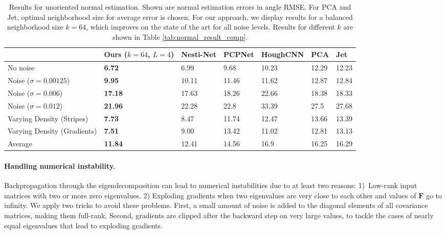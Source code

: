 \documentclass[10pt,twocolumn,letterpaper]{article}
\begin{document}
\begin{table*}[t]
\small
  \centering
\begin{tabular}{lllllll}
      \toprule
   & Ours ($k=64$, $L=4$) & Nesti-Net \cite{Ben-Shabat:2018} & PCPNet \cite{Guerrero:2018} & HoughCNN \cite{Boulch:2016} & PCA & Jet \cite{Cazals:2003} \\ \midrule
No noise    & \textbf{6.72} & 6.99      & 9.68   & 10.23    &  12.29   &   12.23  \\ 
Noise ($\sigma = 0.00125$) & \textbf{9.95}    & 10.11     & 11.46  & 11.62    &  12.87   &   12.84  \\ 
Noise ($\sigma  = 0.006$)   &   \textbf{17.18}  & 17.63     & 18.26  & 22.66    &  18.38   &   18.33  \\ 
Noise ($\sigma  = 0.012$)   &  \textbf{21.96}   & 22.28     & 22.8   & 33.39    &   27.5  &   27.68  \\ 
Varying Density (Stripes)    &    \textbf{7.73}         & 8.47      & 11.74  & 12.47    &   13.66  &   13.39  \\ 
Varying Density (Gradients)  &    \textbf{7.51}         & 9.00      & 13.42  & 11.02    &   12.81  &   13.13  \\ 
\midrule
Average &    \textbf{11.84}         & 12.41     & 14.56  & 16.9     &  16.25   &   16.29  \\
\bottomrule
\end{tabular}
\caption{Results for unoriented normal estimation. Shown are normal estimation errors in angle RMSE. For PCA and Jet, optimal neighborhood size for average error is chosen. For our approach, we display results for a balanced neighborhood size $k=64$, which improves on the state of the art for all noise levels. Results for different $k$ are shown in Table \ref{tab:normal_result_comp}.} \label{tab:pcpnet_results}
\vspace{-0.3cm}
\end{table*}

\paragraph{Handling numerical instability.} Backpropagation through the eigendecomposition can lead to numerical instabilities due to at least two reasons: \mbox{1) Low-rank} input matrices with two or more zero eigenvalues. 2) Exploding gradients when two eigenvalues are very close to each other and values of $\mathbf{F}$ go to infinity. We apply two tricks to avoid these problems. First, a small amount of noise is added to the diagonal elements of all covariance matrices, making them full-rank. Second, gradients are clipped after the backward step on very large values, to tackle the cases of nearly equal eigenvalues that lead to exploding gradients.
\end{document}
